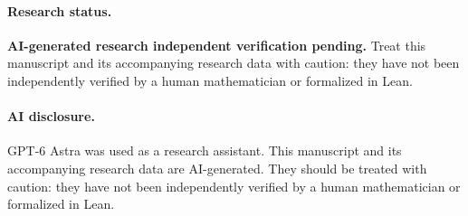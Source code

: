 \documentclass[11pt]{article}
\begin{document}
\paragraph{Research status.} \textbf{AI-generated research \textperiodcentered{} independent verification pending.} Treat this manuscript and its accompanying research data with caution: they have not been independently verified by a human mathematician or formalized in Lean.
\setcounter{tocdepth}{1}{\footnotesize\tableofcontents}





















\clearpage
\begingroup\small


\endgroup
\paragraph{AI disclosure.} GPT-6 Astra was used as a research assistant.
This manuscript and its accompanying research data are AI-generated. They should be treated with caution: they have not been independently verified by a human mathematician or formalized in Lean.
\end{document}
